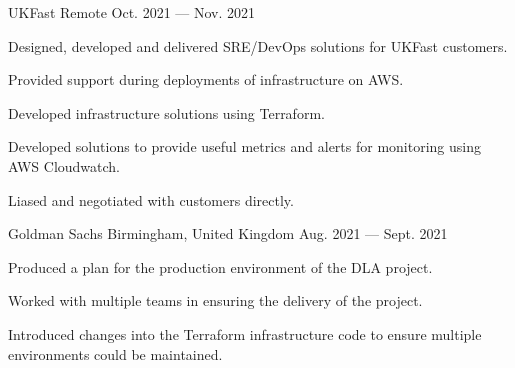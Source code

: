 

\begin{cventries}

    {UKFast}
    {Remote}
    {Oct. 2021 — Nov. 2021}
    {
        \begin{cvitems}
	    \item{Designed, developed and delivered SRE/DevOps solutions for UKFast customers.}
            \item{Provided support during deployments of infrastructure on AWS.}
            \item{Developed infrastructure solutions using Terraform.}
            \item{Developed solutions to provide useful metrics and alerts for monitoring using AWS Cloudwatch.}
	    \item{Liased and negotiated with customers directly.}
        \end{cvitems}
    }
    {Goldman Sachs}
    {Birmingham, United Kingdom}
    {Aug. 2021 — Sept. 2021}
    {
        \begin{cvitems}
	    \item{Produced a plan for the production environment of the DLA project.}
            \item{Worked with multiple teams in ensuring the delivery of the project.}
	    \item{Introduced changes into the Terraform infrastructure code to ensure multiple environments could be maintained.}
        \end{cvitems}
    }


\end{cventries}
